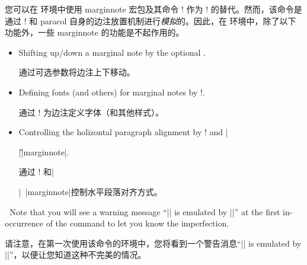 \begin{description}
您可以在  环境中使用 \textsf{marginnote} 宏包及其命令 \!\marginnote! 作为 \!\marginpar! 的替代。然而，该命令是通过 \!\marginpar! 和 \textsf{paracol} 自身的边注放置机制进行\emph{模拟}的。因此，在  环境中，除了以下功能外，一些 \textsf{marginnote} 的功能是不起作用的。
\begin{itemize}
\item
Shifting up/down a marginal note by the optional .

通过可选参数将边注上下移动。
\item
Defining fonts (and others) for marginal notes by \!\marginfont!.

通过 \!\marginfont! 为边注定义字体（和其他样式）。
\item
Controlling the holizontal paragraph alignment by \!\raggedleftmarginnote!
and |\raggedright|\~|marginnote|\SpecialIndex{\raggedrightmarginnote}.

通过 \!\raggedleftmarginnote! 和|\raggedright|~|marginnote|控制水平段落对齐方式。
\end{itemize}

Note that you will see a warning message ``|\margninnote| is emulated by
|\marginpar|'' at the first in- occurrence of the command to
let you know the imperfection.

请注意，在第一次使用该命令的环境中，您将看到一个警告消息“|\margninnote| is emulated by |\marginpar|”，以便让您知道这种不完美的情况。
\end{description}

